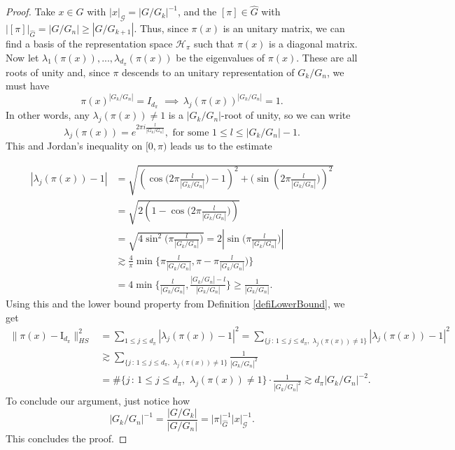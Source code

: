 \documentclass[12pt, reqno]{amsart}
\newcommand{\1}{\mathds{1}}
\begin{document}
\begin{proof}
Take $x \in G$ with $|x|_{\mathcal{G}} = |G/G_k|^{-1}$, and the $[\pi] \in \widehat{G}$ with $|[\pi]|_{\widehat{G}} = |G/G_{n}| \geq |G/G_{k+1}|$. Thus, since $\pi (x)$ is an unitary matrix, we can find a basis of the representation space $\mathcal{H}_\pi$ such that $\pi(x)$ is a diagonal matrix. Now let $\lambda_1 (\pi(x)), ..., \lambda_{d_\pi} (\pi(x))$ be the eigenvalues of $\pi (x)$. These are all roots of unity and, since $\pi$ descends to an unitary representation of $G_k / G_n$, we must have $$\pi(x)^{|G_k / G_n|} = I_{d_\pi} \, \, \implies \, \lambda_j (\pi(x))^{|G_k / G_n|} = 1.$$In other words, any $\lambda_j (\pi (x)) \neq 1$ is a $|G_k / G_n|$-root of unity, so we can write  $$\lambda_j (\pi (x)) = e^{2 \pi i \frac{l}{|G_k / G_n|}},   \, \, \text{for some} \, \, 1 \leq l \leq |G_k / G_n| -1. $$ 
This and Jordan's inequality on $[0, \pi)$ leads us to the estimate 

\begin{align*}
    |\lambda_j (\pi (x)) -1| &= \sqrt{( \cos \big(2 \pi  \frac{l}{|G_k / G_n|}\big) - 1)^2 + \big(\sin (2 \pi  \frac{l}{|G_k / G_n|} \big))^2} \\ &= \sqrt{2(1 -\cos \big(2 \pi  \frac{l}{|G_k / G_n|}\big))} \\& = \sqrt{4 \sin^2 \big( \pi  \frac{l}{|G_k / G_n|}\big)} = 2|\sin \big(\pi  \frac{l}{|G_k / G_n|}\big)| \\ & \gtrsim \frac{4}{\pi} \min \big\{\pi  \frac{l}{|G_k / G_n|} , \pi-    \pi \frac{l}{|G_k / G_n|}\big)\big\} \\ & = 4  \min \big\{  \frac{l}{|G_k / G_n|} ,    \frac{|G_k / G_n| - l}{|G_k / G_n|} \big\} \geq \frac{1}{|G_k / G_n|}. 
\end{align*}
Using this and the lower bound property from Definition \ref{defiLowerBound}, we get \begin{align*}
    \| \pi (x) - \mathrm{I}_{d_\pi} \|_{HS}^2 & = \sum_{1 \leq j \leq d_\pi} |\lambda_j (\pi (x)) -1|^2 = \sum_{\{ j \, : \, 1 \leq j \leq d_\pi, \,\, \lambda_j (\pi(x)) \neq 1 \}} |\lambda_j (\pi (x)) -1|^2 \\ & \gtrsim \sum_{\{ j \, : \, 1 \leq j \leq d_\pi, \,\, \lambda_j (\pi(x)) \neq 1 \}} \frac{1}{|G_k / G_n|^2} \\ & = \#\{ j \, : \, 1 \leq j \leq d_\pi, \,\, \lambda_j (\pi(x)) \neq 1 \} \cdot \frac{1}{|G_k / G_n|^2} \gtrsim d_\pi |G_k / G_n|^{-2}. 
\end{align*} 
To conclude our argument, just notice how $$|G_k / G_n|^{-1} = \frac{|G/G_k|}{|G/G_n|} = |\pi|_{\widehat{G}}^{-1} |x|_{\mathcal{G}}^{-1}.$$
This concludes the proof.
\end{proof}
\end{document}
